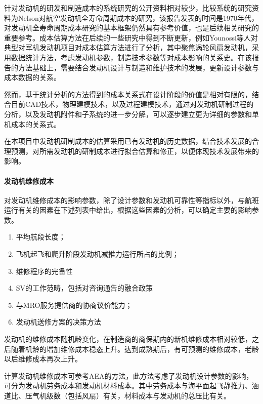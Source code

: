\documentclass[12pt,a4paper]{report}
\begin{document}
针对发动机的研发和制造成本的系统研究的公开资料相对较少，比较系统的研究资料为Nelson对航空发动机全寿命周期成本的研究\cite{nelson1977life}，该报告发表的时间是1970年代，对发动机全寿命周期成本研究的基本框架仍然具有参考价值，也是后续相关研究的重要参考。成本估算方法在后续的一些研究中得到不断更新，例如Younossi等人对典型对军机发动机项目对成本估算方法进行了分析\cite{younossi2002military}，其中聚焦涡轮风扇发动机，采用数据统计方法，考虑发动机参数，制造技术参数等对成本影响的关系史。在该报告的方法基础上，需要结合发动机设计与制造和维护技术的发展，更新设计参数与成本数据的关系。

然而，基于统计分析的方法得到的成本关系式在设计阶段的价值是相对有限的，结合目前CAD技术，物理建模技术，以及过程建模技术，通过对发动机研制过程的分析，以及发动机附件和子系统的进一步分解，可以逐步建立更为详细的参数和单机成本的关系式。

在本项目中发动机研制成本的估算采用已有发动机的历史数据，结合技术发展的合理预测，对所需发动机的研制成本进行拟合估算和修正，以便体现技术发展带来的影响。

\paragraph{发动机维修成本}
对发动机维修成本的影响参数，除了设计参数和发动机可靠性等指标以外，与航班运行有关的因素在下述列表中给出，根据这些因素的分析，可以确定主要的影响参数。

\begin{enumerate}
\item 平均航段长度；
\item 飞机起飞和爬升阶段发动机减推力运行所占的比例；
\item 维修程序的完备性
\item SV的工作范畴，包括对咨询通告的融合政策
\item 与MRO服务提供商的协商议价能力；
\item 发动机送修方案的决策方法
\end{enumerate}

发动机的维修成本随机龄变化，在制造商的商保期内的新机维修成本相对较低，之后随着机龄的增加维修成本稳态上升。达到成熟期后，有可预测的维修成本，老龄以后维修成本再次上升。

计算发动机维修成本可参考AEA的方法，此方法考虑了发动机设计参数的影响，可分为发动机劳务成本和发动机材料成本。其中劳务成本与海平面起飞静推力、涵道比、压气机级数（包括风扇）有关，材料成本与发动机的总压比有关。
\end{document}
